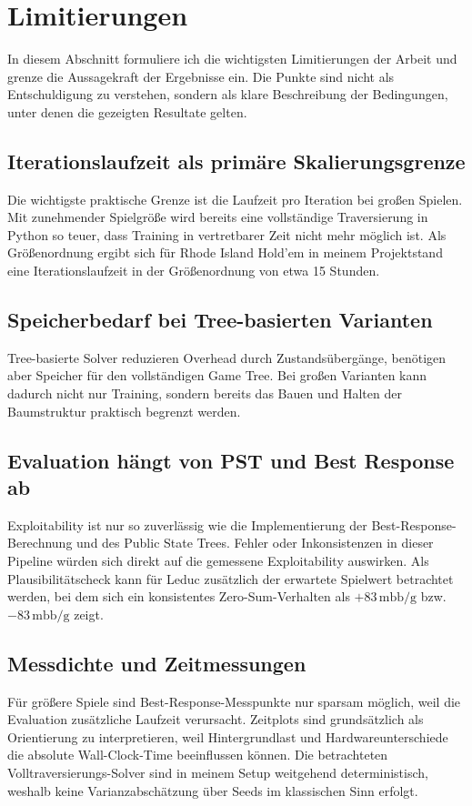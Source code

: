 \section{Limitierungen}
In diesem Abschnitt formuliere ich die wichtigsten Limitierungen der Arbeit und grenze die Aussagekraft der Ergebnisse ein.
Die Punkte sind nicht als Entschuldigung zu verstehen, sondern als klare Beschreibung der Bedingungen, unter denen die gezeigten Resultate gelten.

\subsection{Iterationslaufzeit als primäre Skalierungsgrenze}
Die wichtigste praktische Grenze ist die Laufzeit pro Iteration bei großen Spielen.
Mit zunehmender Spielgröße wird bereits eine vollständige Traversierung in Python so teuer, dass Training in vertretbarer Zeit nicht mehr möglich ist.
Als Größenordnung ergibt sich für Rhode Island Hold'em in meinem Projektstand eine Iterationslaufzeit in der Größenordnung von etwa 15 Stunden.

\subsection{Speicherbedarf bei Tree-basierten Varianten}
Tree-basierte Solver reduzieren Overhead durch Zustandsübergänge, benötigen aber Speicher für den vollständigen Game Tree.
Bei großen Varianten kann dadurch nicht nur Training, sondern bereits das Bauen und Halten der Baumstruktur praktisch begrenzt werden.

\subsection{Evaluation hängt von PST und Best Response ab}
Exploitability ist nur so zuverlässig wie die Implementierung der Best-Response-Berechnung und des Public State Trees.
Fehler oder Inkonsistenzen in dieser Pipeline würden sich direkt auf die gemessene Exploitability auswirken.
Als Plausibilitätscheck kann für Leduc zusätzlich der erwartete Spielwert betrachtet werden, bei dem sich ein konsistentes Zero-Sum-Verhalten als \(+83\,\mathrm{mbb/g}\) bzw.\ \(-83\,\mathrm{mbb/g}\) zeigt.

\subsection{Messdichte und Zeitmessungen}
Für größere Spiele sind Best-Response-Messpunkte nur sparsam möglich, weil die Evaluation zusätzliche Laufzeit verursacht.
Zeitplots sind grundsätzlich als Orientierung zu interpretieren, weil Hintergrundlast und Hardwareunterschiede die absolute Wall-Clock-Time beeinflussen können.
Die betrachteten Volltraversierungs-Solver sind in meinem Setup weitgehend deterministisch, weshalb keine Varianzabschätzung über Seeds im klassischen Sinn erfolgt.

